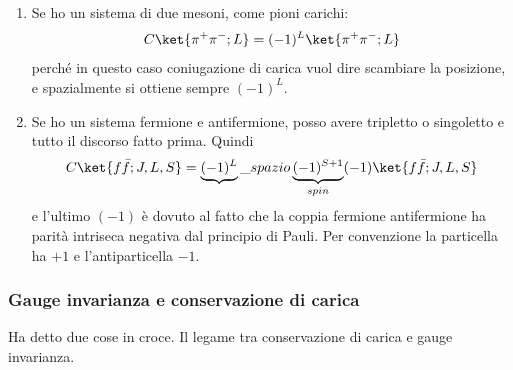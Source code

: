 \begin{itemize}
    \begin{enumerate}
        \item Se ho un sistema di due mesoni, come pioni carichi:
        \begin{equation*}
            C\ket{\pi^+\pi^-;L}=(-1)^{L}\ket{\pi^+\pi^-;L}
        \end{equation*}
        perché in questo caso coniugazione di carica vuol dire scambiare la posizione, e spazialmente si ottiene sempre $(-1)^L$.
        \item Se ho un sistema fermione e antifermione, posso avere tripletto o singoletto e tutto il discorso fatto prima. Quindi
        \begin{equation*}
            C\ket{f\bar f;J,L,S}=\underbrace{(-1)^{L}}\_{spazio}\underbrace{(-1)^{S+1}}_{spin}(-1)\ket{f\bar f;J,L,S}
        \end{equation*}
        e l'ultimo $(-1)$ è dovuto al fatto che la coppia fermione antifermione ha parità intriseca negativa dal principio di Pauli. Per convenzione la particella ha $+1$ e l'antiparticella $-1$.
    \end{enumerate} 
\end{itemize}
\subsubsection{Gauge invarianza e conservazione di carica}
Ha detto due cose in croce. Il legame tra conservazione di carica e gauge invarianza.
